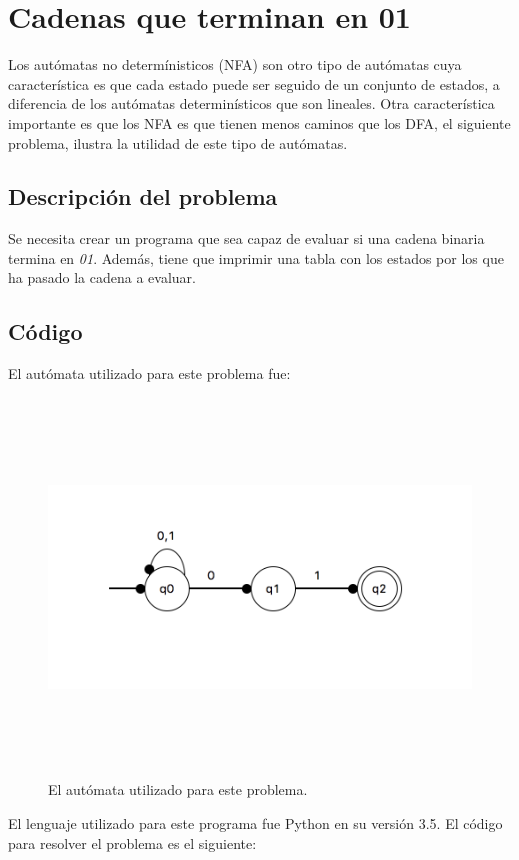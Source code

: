 \documentclass[12pt]{article}
\begin{document}
\newpage
\section{Cadenas que terminan en 01}
Los autómatas no determínisticos (NFA) son otro tipo de autómatas cuya característica es que cada estado puede ser seguido de un conjunto de estados, a diferencia de los autómatas determinísticos que son lineales. Otra característica importante es que los NFA es que tienen menos caminos que los DFA, el siguiente problema, ilustra la utilidad de este tipo de autómatas.

\subsection{Descripción del problema}
Se necesita crear un programa que sea capaz de evaluar si una cadena binaria termina en \textit{01}. Además, tiene que imprimir una tabla con los estados por los que ha pasado la cadena a evaluar.

\subsection{Código}
El autómata utilizado para este problema fue:

\begin{figure}[H]
\includegraphics[width=\textwidth, height=10cm]{automata_cero_uno}
\caption{El autómata utilizado para este problema.}
\label{fig:automata_cero_uno_modelo}
\end{figure}

El lenguaje utilizado para este programa fue Python en su versión 3.5. El código para resolver el problema es el siguiente:\\
\end{document}
